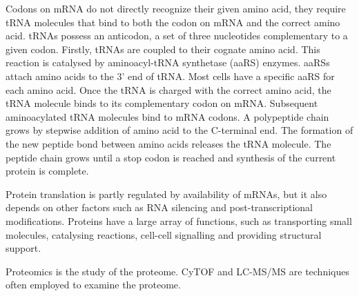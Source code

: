 Codons on mRNA do not directly recognize their given amino acid, they require tRNA molecules that bind to both the codon on mRNA and the correct amino acid.
tRNAs possess an anticodon, a set of three nucleotides complementary to a given codon.
Firstly, tRNAs are coupled to their cognate amino acid.
This reaction is catalysed by aminoacyl-tRNA synthetase (aaRS) enzymes.
aaRSs attach amino acids to the 3' end of tRNA.
Most cells have a specific aaRS for each amino acid.
Once the tRNA is charged with the correct amino acid, the tRNA molecule binds to its complementary codon on mRNA.
Subsequent aminoacylated tRNA molecules bind to mRNA codons.
A polypeptide chain grows by stepwise addition of amino acid to the C-terminal end.
The formation of the new peptide bond between amino acids releases the tRNA molecule.
The peptide chain grows until a stop codon is reached and synthesis of the current protein is complete.

Protein translation is partly regulated by availability of mRNAs, but it also depends on other factors such as RNA silencing and post-transcriptional modifications.
Proteins have a large array of functions, such as transporting small molecules, catalysing reactions, cell-cell signalling and providing structural support.

Proteomics is the study of the proteome.
CyTOF and LC-MS/MS are techniques often employed to examine the proteome. %

